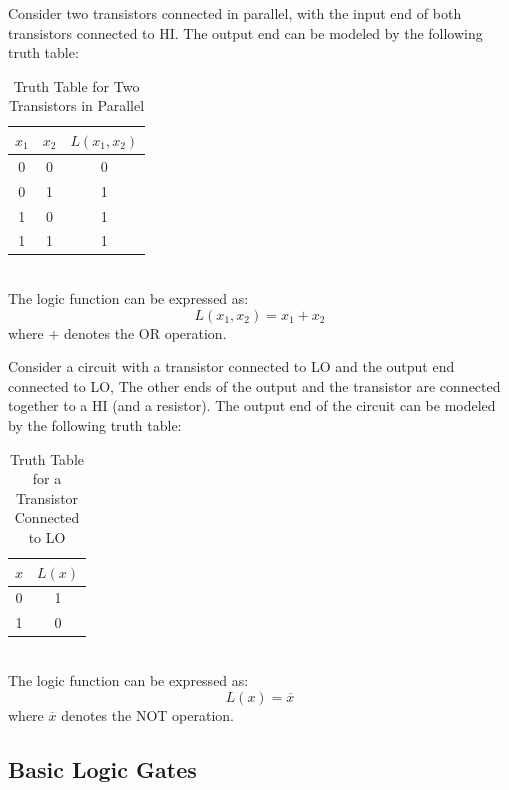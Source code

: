 \documentclass[11pt]{report}
\begin{document}
\begin{example}
    Consider two transistors connected in parallel, with the input end of both transistors connected to HI. The output end can be modeled by the following truth table:
    \begin{table}[h!]
        \centering
        \begin{tabular}{|c|c|c|}
            \hline
            $x_1$ & $x_2$ & $L(x_1, x_2)$ \\
            \hline  
            0 & 0 & 0 \\
            0 & 1 & 1 \\
            1 & 0 & 1 \\
            1 & 1 & 1 \\
            \hline
        \end{tabular}
        \caption{Truth Table for Two Transistors in Parallel}
        \label{tab:or_gate}
    \end{table}
    \\
    The logic function can be expressed as:
    $$
        L(x_1, x_2) = x_1 + x_2
    $$
    where $+$ denotes the OR operation.
\end{example}

\begin{example}
    Consider a circuit with a transistor connected to LO and the output end connected to LO, The other ends of the output and the transistor are connected together to a HI (and a resistor). The output end of the circuit can be modeled by the following truth table:
    \begin{table}[h!]
        \centering
        \begin{tabular}{|c|c|}
            \hline
            $x$ & $L(x)$ \\
            \hline
            0 & 1 \\
            1 & 0 \\
            \hline
        \end{tabular}
        \caption{Truth Table for a Transistor Connected to LO}
        \label{tab:not_gate}
    \end{table}
    \\
    The logic function can be expressed as:
    $$
        L(x) = \overline{x}
    $$
    where $\overline{x}$ denotes the NOT operation.
\end{example}

\subsection{Basic Logic Gates}
\end{document}
